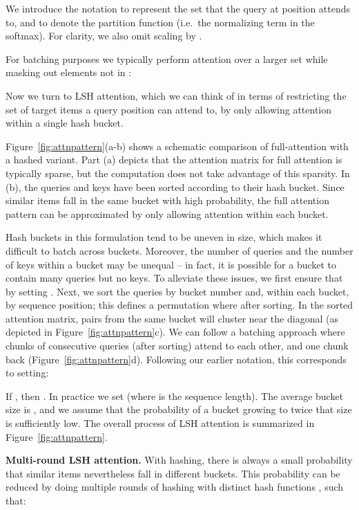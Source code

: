 \documentclass{article} \usepackage{iclr2020_conference,times}
\renewcommand{\paragraph}[1]{\textbf{#1}}
\begin{document}
We introduce the notation  to represent the set that the query at position  attends to, and  to denote the partition function (i.e.\ the normalizing term in the softmax). For clarity, we also omit scaling by .

For batching purposes we typically perform attention over a larger set  while masking out elements not in :


Now we turn to LSH attention, which we can think of in terms of restricting the set  of target items a query position  can attend to, by only allowing attention within a single hash bucket.


Figure~\ref{fig:attnpattern}(a-b) shows a schematic comparison of full-attention with a hashed variant. Part (a) depicts that the attention matrix for full attention is typically sparse, but the computation does not take advantage of this sparsity. In (b), the queries and keys have been sorted according to their hash bucket. Since similar items fall in the same bucket with high probability, the full attention pattern can be approximated by only allowing attention within each bucket.

Hash buckets in this formulation tend to be uneven in size, which makes it difficult to batch across buckets. Moreover, the number of queries and the number of keys within a bucket may be unequal -- in fact, it is possible for a bucket to contain many queries but no keys. To alleviate these issues, we first ensure that  by setting . Next, we sort the queries by bucket number and, within each bucket, by sequence position; this defines a permutation where  after sorting. In the sorted attention matrix, pairs from the same bucket will cluster near the diagonal (as depicted in Figure~\ref{fig:attnpattern}c). We can follow a batching approach where chunks of  consecutive queries (after sorting) attend to each other, and one chunk back (Figure~\ref{fig:attnpattern}d). Following our earlier notation, this corresponds to setting:

If , then . In practice we set  (where  is the sequence length). The average bucket size is , and we assume that the probability of a bucket growing to twice that size is sufficiently low.
The overall process of LSH attention is summarized in Figure~\ref{fig:attnpattern}.

\paragraph{Multi-round LSH attention.}
With hashing, there is always a small probability that similar items nevertheless fall in different buckets. This probability can be reduced by doing multiple rounds of hashing with  distinct hash functions , such that:
\end{document}
